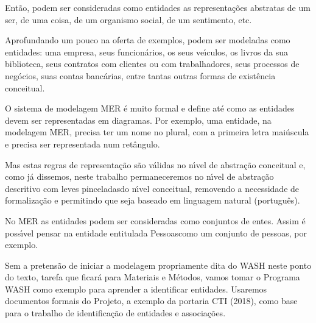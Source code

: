 \documentclass[
12pt,		%
openright,	%
twoside,  %
a4paper,			%
chapter=TITLE,		%
english,			%
french,				%
spanish,			%
brazil				%
]{USPSC-classe/USPSC}
\begin{document}
Ent\~ao, podem ser consideradas como entidades as representa\c{c}\~oes abstratas de um ser, de uma coisa, de um organismo social, de um sentimento, etc.









Aprofundando um pouco na oferta de exemplos, podem ser modeladas como entidades: uma empresa, seus funcion\'arios, os seus ve\'{\i}culos, os livros da sua biblioteca, seus contratos com clientes ou com trabalhadores, seus processos de neg\'ocios, suas contas banc\'arias, entre tantas outras formas de exist\^encia conceitual.









O sistema de modelagem MER \'e muito formal e define at\'e como as entidades devem ser representadas em diagramas. Por exemplo, uma entidade, na modelagem MER, precisa ter um nome no plural, com a primeira letra mai\'uscula e precisa ser representada num ret\^angulo.









Mas estas regras de representa\c{c}\~ao s\~ao v\'alidas no n\'{\i}vel de abstra\c{c}\~ao conceitual e, como j\'a dissemos, neste trabalho permaneceremos no n\'{\i}vel de abstra\c{c}\~ao descritivo com \textquotedbl leves pinceladas\textquotedbl  do n\'{\i}vel conceitual, removendo a necessidade de formaliza\c{c}\~ao e permitindo que seja baseado em linguagem natural (portugu\^es).









No MER as entidades podem ser consideradas como conjuntos de entes. Assim \'e poss\'{\i}vel pensar na entidade entitulada \textquotedbl Pessoas\textquotedbl  como um conjunto de pessoas, por exemplo.









Sem a pretens\~ao de iniciar a modelagem propriamente dita do WASH neste ponto do texto, tarefa que ficar\'a para Materiais e M\'etodos, vamos tomar o Programa WASH como exemplo para aprender a identificar entidades. Usaremos documentos formais do Projeto, a exemplo da portaria CTI (2018), como base para o trabalho de identifica\c{c}\~ao de entidades e associa\c{c}\~oes.
\end{document}
